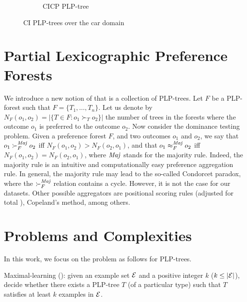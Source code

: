 \begin{figure}[!ht]
\begin{subfigure}[b]{0.25\textwidth}
		\caption{CICP PLP-tree \label{fig:CICP_PLPT}}
	\end{subfigure}
  \caption{CI PLP-trees over the car domain}
  \label{fig:CI}
\end{figure}


\section{Partial Lexicographic Preference Forests}
We introduce a new notion of
 that is a collection of PLP-trees.
Let $F$ be a PLP-forest such that $F = \{T_1,\ldots,T_n\}$.
Let us denote by $N_F(o_1,o_2)=|\{T \in F:o_1 \succ_T o_2\}|$
the number of trees in the forests where the outcome $o_1$ is
preferred to the outcome $o_2$.
Now consider the dominance testing problem.
Given a preference forest $F$, and two outcomes $o_1$ and $o_2$,
we say that $o_1 \succ_F^{\mathit{Maj}} o_2$ iff $N_F(o_1,o_2)>N_F(o_2,o_1)$,
and that $o_1 \approx_F^{\mathit{Maj}} o_2$ iff $N_F(o_1,o_2)=N_F(o_2,o_1)$,
where $\mathit{Maj}$ stands for the majority rule.
Indeed, the majority rule is an intuitive and computationally easy
preference aggregation rule.
In general, the majority rule may lead to the so-called Condorcet paradox, where
the $\succ_F^{\mathit{Maj}}$ relation contains a cycle.
However, it is not the case for our datasets.
Other possible aggregators are positional
scoring rules (adjusted for total ), Copeland's
method, among others.


\section{Problems and Complexities}
In this work, we focus on the  problem as follows for PLP-trees.
\begin{definition}
	Maximal-learning (): given an example set $\mathcal{E}$ and a 
	positive integer $k$ ($k \leq |\mathcal{E}|$), decide whether there exists a PLP-tree 
	$T$ (of a particular type) such that $T$ satisfies at least $k$ examples 
	in $\mathcal{E}$.
\end{definition}


